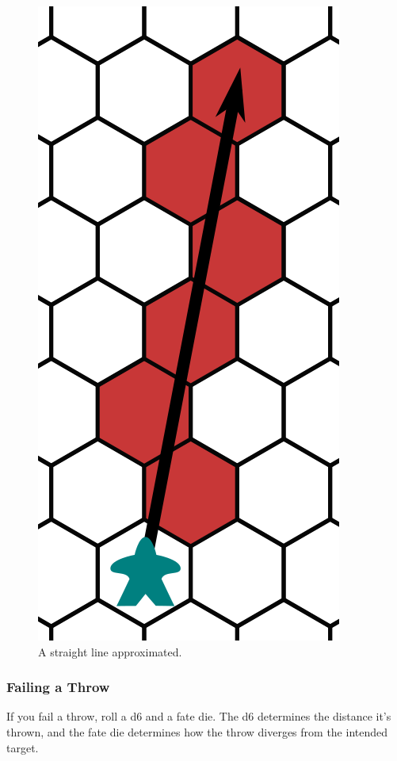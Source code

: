 \begin{figure}
    \centering
    \includegraphics{graphics/throwing-cropped.png}
    \caption{A straight line approximated.}
    \label{fig:line-throw}
\end{figure}

\subsubsection{Failing a Throw}
If you fail a throw, roll a d6 and a fate die.
The d6 determines the distance it’s thrown, and the fate die determines how the throw diverges from the intended target.


